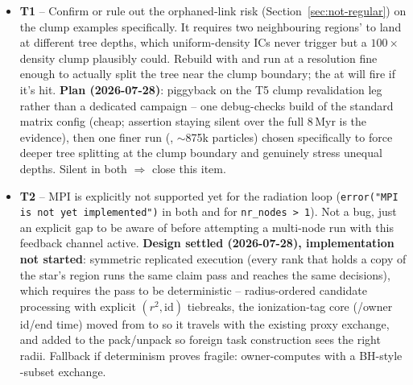 \begin{itemize}
  \item[$\square$] \textbf{T1} -- Confirm or rule out the
     orphaned-link risk
    (Section~\ref{sec:not-regular}) on the clump examples specifically.
    It requires two neighbouring regions'  to land
    at different tree depths, which uniform-density ICs never trigger
    but a $100\times$ density clump plausibly could. Rebuild with
     and run
     at a resolution fine enough
    to actually split the tree near the clump boundary; the
     at  will fire if it's hit.
    \textbf{Plan (2026-07-28)}: piggyback on the T5 clump
    revalidation leg rather than a dedicated campaign -- one
    debug-checks build of the standard  matrix
    config (cheap; assertion staying silent over the full $8\,$Myr is
    the evidence), then one finer run (,
    $\sim$875k particles) chosen specifically to force deeper tree
    splitting at the clump boundary and genuinely stress unequal
     depths. Silent in both $\Rightarrow$ close
    this item.

  \item[$\square$] \textbf{T2} -- MPI is explicitly not supported yet
    for the radiation loop (\texttt{error("MPI is not yet
    implemented")} in both  and 
    for \texttt{nr\_nodes > 1}). Not a bug, just an explicit gap to be
    aware of before attempting a multi-node run with this feedback
    channel active. \textbf{Design settled (2026-07-28), implementation
    not started}: symmetric replicated execution (every rank that holds
    a copy of the star's region runs the same claim pass and reaches the
    same decisions), which requires the pass to be deterministic --
    radius-ordered candidate processing with explicit
    $(r^2,\mathrm{id})$ tiebreaks, the ionization-tag core
    (/owner id/end time) moved from  to
     so it travels with the existing proxy exchange, and
     added to the  pack/unpack so
    foreign task construction sees the right radii. Fallback if
    determinism proves fragile: owner-computes with a BH-style
    -subset exchange.


\end{itemize}
